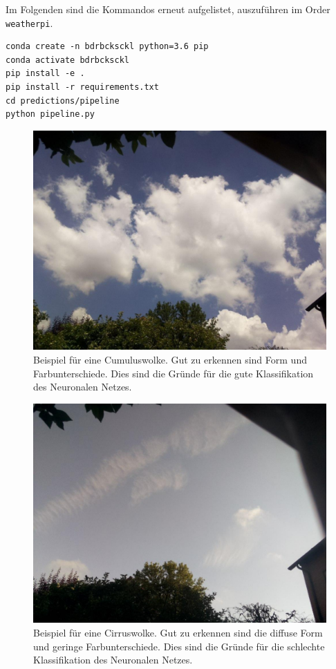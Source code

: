Im Folgenden sind die Kommandos erneut aufgelistet, auszuführen im Order
\texttt{weatherpi}.

\begin{verbatim}
conda create -n bdrbcksckl python=3.6 pip
conda activate bdrbcksckl
pip install -e .
pip install -r requirements.txt
cd predictions/pipeline
python pipeline.py
\end{verbatim}

\newpage

\begin{figure}[ht]
  \centering
  \includegraphics[height=0.25\textheight]{content/cumulus.pdf}
  \caption{Beispiel für eine Cumuluswolke. Gut zu erkennen sind Form und Farbunterschiede. Dies
  sind die Gründe für die gute Klassifikation des Neuronalen Netzes.}
  \label{fig:cumulus}
\end{figure}

\begin{figure}[ht]
  \centering
  \includegraphics[height=0.25\textheight]{content/cirrus.pdf}
  \caption{Beispiel für eine Cirruswolke. Gut zu erkennen sind die diffuse Form und geringe Farbunterschiede. Dies
  sind die Gründe für die schlechte Klassifikation des Neuronalen Netzes.}
  \label{fig:cirrus}
\end{figure}
